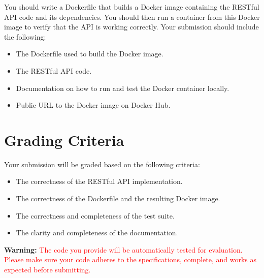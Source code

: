 \documentclass{article}
\begin{document}
You should write a Dockerfile that builds a Docker image containing the RESTful API code and its dependencies. You should then run a container from this Docker image to verify that the API is working correctly.
Your submission should include the following:

\begin{itemize}
	\item The Dockerfile used to build the Docker image.
	\item The RESTful API code.
	\item Documentation on how to run and test the Docker container locally.
	\item Public URL to the Docker image on Docker Hub.
\end{itemize}


\section*{Grading Criteria}

Your submission will be graded based on the following criteria:

\begin{itemize}
	\item The correctness of the RESTful API implementation.
	\item The correctness of the Dockerfile and the resulting Docker image.
	\item The correctness and completeness of the test suite.
	\item The clarity and completeness of the documentation.
\end{itemize}


\begin{center}
	\begin{minipage}{0.9\textwidth}
		\begin{center}
			\textbf{Warning:} \textcolor{red}{The code you provide will be automatically tested for evaluation. Please make sure your code adheres to the specifications, complete, and works as expected before submitting.}
		\end{center}
	\end{minipage}
\end{center}
\end{document}
